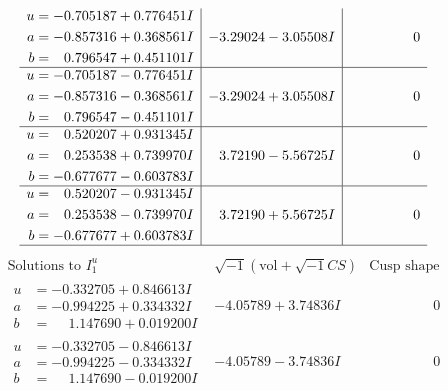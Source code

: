 \documentclass[1p]{elsarticle_modified}
\theoremstyle{definition}
\newcommand{\I}{\sqrt{-1}}
\begin{document}
$$\begin{array}{c|c|c}
\begin{aligned}
u &= -0.705187 + 0.776451 I \\
a &= -0.857316 + 0.368561 I \\
b &= \phantom{-}0.796547 + 0.451101 I\end{aligned}
 & -3.29024 - 3.05508 I & \phantom{-0.000000 } 0 \\ \hline\begin{aligned}
u &= -0.705187 - 0.776451 I \\
a &= -0.857316 - 0.368561 I \\
b &= \phantom{-}0.796547 - 0.451101 I\end{aligned}
 & -3.29024 + 3.05508 I & \phantom{-0.000000 } 0 \\ \hline\begin{aligned}
u &= \phantom{-}0.520207 + 0.931345 I \\
a &= \phantom{-}0.253538 + 0.739970 I \\
b &= -0.677677 - 0.603783 I\end{aligned}
 & \phantom{-}3.72190 - 5.56725 I & \phantom{-0.000000 } 0 \\ \hline\begin{aligned}
u &= \phantom{-}0.520207 - 0.931345 I \\
a &= \phantom{-}0.253538 - 0.739970 I \\
b &= -0.677677 + 0.603783 I\end{aligned}
 & \phantom{-}3.72190 + 5.56725 I & \phantom{-0.000000 } 0\\
 \hline 
 \end{array}$$\newpage$$\begin{array}{c|c|c}  
\text{Solutions to }I^u_{1}& \I (\text{vol} + \sqrt{-1}CS) & \text{Cusp shape}\\
 \hline 
\begin{aligned}
u &= -0.332705 + 0.846613 I \\
a &= -0.994225 + 0.334332 I \\
b &= \phantom{-}1.147690 + 0.019200 I\end{aligned}
 & -4.05789 + 3.74836 I & \phantom{-0.000000 } 0 \\ \hline\begin{aligned}
u &= -0.332705 - 0.846613 I \\
a &= -0.994225 - 0.334332 I \\
b &= \phantom{-}1.147690 - 0.019200 I\end{aligned}
 & -4.05789 - 3.74836 I & \phantom{-0.000000 } 0 \\ \hline\begin{aligned}

\end{aligned}
\end{array}$$
\end{document}
